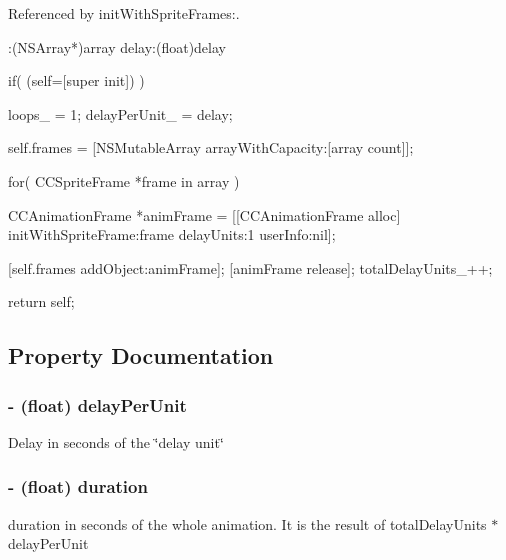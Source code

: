 Referenced by init\-With\-Sprite\-Frames\-:.


\begin{DoxyCode}
                          :(NSArray*)array delay:(float)delay
{
        if( (self=[super init]) )
        {
                loops_ = 1;
                delayPerUnit_ = delay;

                self.frames = [NSMutableArray arrayWithCapacity:[array count]];
                
                for( CCSpriteFrame *frame in array ) {
                        CCAnimationFrame *animFrame = [[CCAnimationFrame alloc]
       initWithSpriteFrame:frame delayUnits:1 userInfo:nil];
                        
                        [self.frames addObject:animFrame];
                        [animFrame release];
                        totalDelayUnits_++;
                }
                
        }
        return self;
}
\end{DoxyCode}


\subsection{Property Documentation}
\hypertarget{interface_c_c_animation_a78370b61241db87d7ddad83be227f26a}{
\subsubsection[{delay\-Per\-Unit}]{\setlength{\rightskip}{0pt plus 5cm}-\/ (float) {\bf delay\-Per\-Unit}}}\label{interface_c_c_animation_a78370b61241db87d7ddad83be227f26a}
Delay in seconds of the \char`\"{}delay unit\char`\"{} \hypertarget{interface_c_c_animation_af9b150cae2741992c739e3ea27a51727}{
\subsubsection[{duration}]{\setlength{\rightskip}{0pt plus 5cm}-\/ (float) {\bf duration}}}\label{interface_c_c_animation_af9b150cae2741992c739e3ea27a51727}
duration in seconds of the whole animation. It is the result of total\-Delay\-Units $\ast$ delay\-Per\-Unit 

